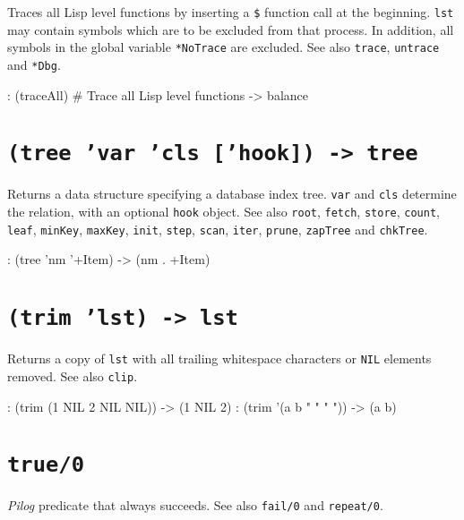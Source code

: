 {Traces all Lisp level functions by inserting a \texttt{\$} function call at the
beginning. \texttt{lst} may contain symbols which are to be excluded from that
process. In addition, all symbols in the global variable \texttt{*NoTrace} are
excluded. See also \texttt{trace}, \texttt{untrace} and \texttt{*Dbg}.


\begin{wideverbatim}
: (traceAll)      # Trace all Lisp level functions
-> balance
\end{wideverbatim}

 
\section*{\texttt{(tree 'var 'cls ['hook]) -> tree}}
\label{sec:func-ref-T-(tree 'var 'cls ['hook]) -> tree}


Returns a data structure specifying a database index tree. \texttt{var} and
\texttt{cls} determine the relation, with an optional \texttt{hook} object. See also
\texttt{root}, \texttt{fetch}, \texttt{store}, \texttt{count}, \texttt{leaf}, \texttt{minKey}, \texttt{maxKey}, \texttt{init},
\texttt{step}, \texttt{scan}, \texttt{iter}, \texttt{prune}, \texttt{zapTree} and \texttt{chkTree}.


\begin{wideverbatim}
: (tree 'nm '+Item)
-> (nm . +Item)
\end{wideverbatim}

 
\section*{\texttt{(trim 'lst) -> lst}}
\label{sec:func-ref-T-(trim 'lst) -> lst}


Returns a copy of \texttt{lst} with all trailing whitespace characters or \texttt{NIL}
elements removed. See also \texttt{clip}.


\begin{wideverbatim}
: (trim (1 NIL 2 NIL NIL))
-> (1 NIL 2)
: (trim '(a b " " " "))
-> (a b)
\end{wideverbatim}

 
\section*{\texttt{true/0}}
\label{sec:func-ref-T-true/0}


\emph{Pilog} predicate that always succeeds. See also
\texttt{fail/0} and \texttt{repeat/0}.


}
